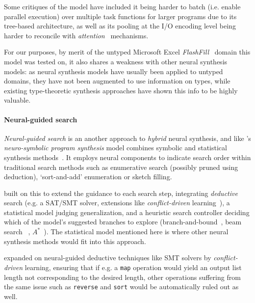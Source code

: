 \documentclass{article}
\begin{document}

Some critiques of the model have included it being harder to batch (i.e. enable parallel execution) over multiple task functions for larger programs due to its tree-based architecture,
as well as its pooling at the I/O encoding level being harder to reconcile with
\emph{attention}~\citep{bahdanau2014neural} mechanisms.~\citep{devlin2017robustfill}

For our purposes, by merit of the untyped Microsoft Excel \emph{FlashFill}~\citep{prose} domain this model was tested on,
it also shares a weakness with other neural synthesis models:
as neural synthesis models have usually been applied to untyped domains,
they have not been augmented to use information on types,
while existing type-theoretic synthesis approaches have shown this info to be highly valuable.

\paragraph{Neural-guided search} \label{sec:ngs}

\emph{Neural-guided search} is an another approach to \emph{hybrid} neural synthesis,
and like \citet{nsps}'s \emph{neuro-symbolic program synthesis} model
combines symbolic and statistical synthesis methods~\citep{nps}.
It employs neural components to indicate search order within traditional search methods
such as enumerative search (possibly pruned using deduction),
`sort-and-add' enumeration or sketch filling.~\citep{deepcoder}

\citet{kalyan2018neural} built on this to extend the guidance to each search step,
integrating \emph{deductive} search (e.g. a SAT/SMT solver, extensions
like \emph{conflict-driven} learning~\citep{feng2018program}),
a statistical model judging generalization,
and a heuristic search controller deciding which of the model's suggested branches
to explore (branch-and-bound~\citep{kalyan2018neural}, beam search%
~\citep{polosukhin2018neural}, $A^{*}$~\citep{lee2018accelerating}).
The statistical model mentioned here is where other
neural synthesis methods would fit into this approach.

\citet{feng2018program} expanded on neural-guided deductive techniques
like SMT solvers by \emph{conflict-driven} learning,
ensuring that if e.g. a \verb|map| operation would yield an
output list length not corresponding to the desired length,
other operations suffering from the same issue such as
\verb|reverse| and \verb|sort| would be automatically ruled out as well.
\end{document}
